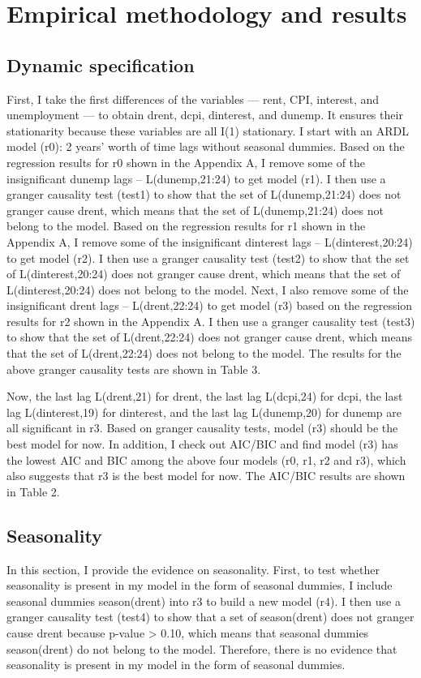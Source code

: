\documentclass[12pt, times]{article}
\begin{document}
\section{Empirical methodology and results}
\subsection{Dynamic specification}
First, I take the first differences of the variables — rent, CPI, interest, and unemployment — to obtain drent, dcpi, dinterest, and dunemp. It ensures their stationarity because these variables are all I(1) stationary. I start with an ARDL model (r0): 2 years’ worth of time lags without seasonal dummies. Based on the regression results for r0 shown in the Appendix A, I remove some of the insignificant dunemp lags – L(dunemp,21:24) to get model (r1). I then use a granger causality test (test1) to show that the set of L(dunemp,21:24) does not granger cause drent, which means that the set of L(dunemp,21:24) does not belong to the model. Based on the regression results for r1 shown in the Appendix A, I remove some of the insignificant dinterest lags – L(dinterest,20:24) to get model (r2). I then use a granger causality test (test2) to show that the set of L(dinterest,20:24) does not granger cause drent, which means that the set of L(dinterest,20:24) does not belong to the model. Next, I also remove some of the insignificant drent lags – L(drent,22:24) to get model (r3) based on the regression results for r2 shown in the Appendix A. I then use a granger causality test (test3) to show that the set of L(drent,22:24) does not granger cause drent, which means that the set of L(drent,22:24) does not belong to the model. The results for the above granger causality tests are shown in Table 3.

\hspace{1.5em}Now, the last lag L(drent,21) for drent, the last lag L(dcpi,24) for dcpi, the last lag L(dinterest,19) for dinterest, and the last lag L(dunemp,20) for dunemp are all significant in r3. Based on granger causality tests, model (r3) should be the best model for now. In addition, I check out AIC/BIC and find model (r3) has the lowest AIC and BIC among the above four models (r0, r1, r2 and r3), which also suggests that r3 is the best model for now. The AIC/BIC results are shown in Table 2.

\subsection{Seasonality}
In this section, I provide the evidence on seasonality. First, to test whether seasonality is present in my model in the form of seasonal dummies, I include seasonal dummies season(drent) into r3 to build a new model (r4). I then use a granger causality test (test4) to show that a set of season(drent) does not granger cause drent because p-value > 0.10, which means that seasonal dummies season(drent) do not belong to the model. Therefore, there is no evidence that seasonality is present in my model in the form of seasonal dummies.
\end{document}
